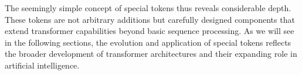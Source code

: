 The seemingly simple concept of special tokens thus reveals considerable depth. These tokens are not arbitrary additions but carefully designed components that extend transformer capabilities beyond basic sequence processing. As we will see in the following sections, the evolution and application of special tokens reflects the broader development of transformer architectures and their expanding role in artificial intelligence.